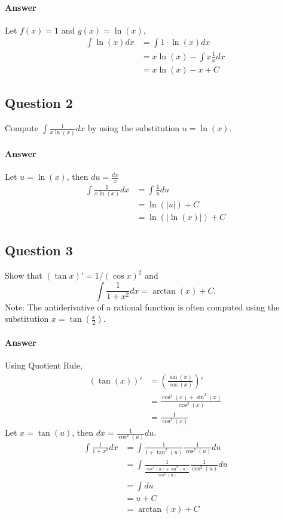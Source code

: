 \paragraph{Answer}
Let $ f(x) = 1 $ and $ g(x) = \ln (x) $,
\begin{align*}
    \int \ln (x) dx &= \int 1 \cdot \ln (x) dx \\
                    &= x \ln (x) - \int x \frac{1}{x} dx \\
                    &= x \ln (x) - x + C
\end{align*}

\subsection{Question 2}
Compute $ \int \frac{1}{x \ln (x)} dx $ by using the substitution
    $ u = \ln (x) $.

\paragraph{Answer}
Let $ u = \ln (x) $, then $ du = \frac{dx}{x} $
\begin{align*}
    \int \frac{1}{x \ln (x)} dx &= \int \frac{1}{u} du \\
                                &= \ln (|u|) + C \\
                                &= \ln (| \ln (x) |) + C
\end{align*}

\subsection{Question 3}
Show that $ (\tan x)' = 1 / (\cos x)^2 $ and
\begin{equation*}
    \int \frac{1}{1 + x^2} dx = \arctan (x) + C.
\end{equation*}
Note: The antiderivative of a rational function is often computed using the
    substitution $ x = \tan (\frac{x}{2}) $.

\paragraph{Answer}
Using Quotient Rule,
\begin{align*}
    (\tan (x))' &= \left( \frac{\sin (x)}{\cos (x)} \right)' \\
                &= \frac{\cos^2 (x) + \sin^2 (x)}{\cos^2 (x)} \\
                &= \frac{1}{\cos^2 (x)}
\end{align*}
Let $ x = \tan (u) $, then $ dx = \frac{1}{\cos^2 (u)} du $.
\begin{align*}
    \int \frac{1}{1 + x^2} dx
        &= \int \frac{1}{1 + \tan^2 (u)} \frac{1}{\cos^2 (u)} du \\
        &= \int \frac{1}{\frac{\cos^2 (u) + \sin^2 (u)}{\cos^2 (u)}}
            \frac{1}{\cos^2 (u)} du \\
        &= \int du \\
        &= u + C \\
        &= \arctan (x) + C
\end{align*}

